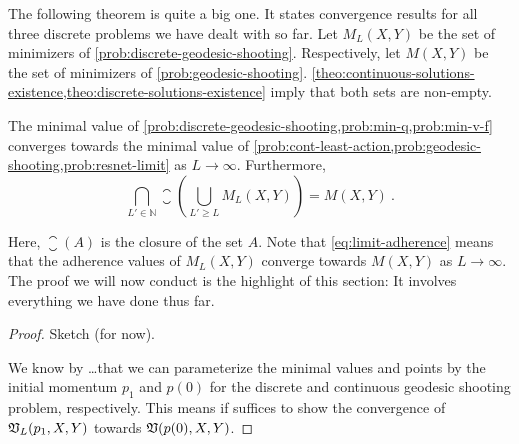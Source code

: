 The following theorem is quite a big one.
It states convergence results for all three discrete problems we have dealt with so far.
Let $M_L(X, Y)$ be the set of minimizers of \cref{prob:discrete-geodesic-shooting}.
Respectively, let $M(X, Y)$ be the set of minimizers of \cref{prob:geodesic-shooting}.
\cref{theo:continuous-solutions-existence,theo:discrete-solutions-existence} imply that both sets are non-empty.
\begin{theorem}
	\label{theo:problem-convergence}
	The minimal value of \cref{prob:discrete-geodesic-shooting,prob:min-q,prob:min-v-f} converges towards the minimal value of \cref{prob:cont-least-action,prob:geodesic-shooting,prob:resnet-limit} as $L \rightarrow \infty$.
	Furthermore,
	\begin{equation}
	\label{eq:limit-adherence}
		\bigcap_{L' \in \mathbb{N}} \closure\left(\bigcup_{L' \geq L} M_L(X, Y)\right) = M(X, Y) \ .
	\end{equation}
\end{theorem}
Here, $\closure (A)$ is the closure of the set $A$.
Note that \cref{eq:limit-adherence} means that the adherence values of $M_L(X, Y)$ converge towards $M(X, Y)$ as $L \rightarrow \infty$.
The proof we will now conduct is the highlight of this section:
It involves everything we have done thus far.
\begin{proof}
	Sketch (for now).
	
	We know by \dots that we can parameterize the minimal values and points by the initial momentum $p_1$ and $p(0)$ for the discrete and continuous geodesic shooting problem, respectively.
	This means if suffices to show the convergence of $\mathfrak{V}_L(p_1, X, Y)$ towards $\mathfrak{V}(p(0), X, Y)$.
\end{proof}